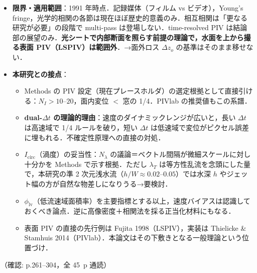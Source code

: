 \documentclass[11pt]{jsarticle}
\begin{document}
\begin{itemize}
\begin{itemize}
    \item 散乱光は小粒子域（1--10~$\mu$m）で像の明るさが $d_p^3$ に比例（散乱エネルギーは $d_p^3$ で増えるが，像の大きさは回折で決まり粒径に依存しないため）．スリップ速度は $d_p^2$ に比例するので，最も明るく写る粒子が最も流れに追従していない＝均一粒径が望ましい．ただし幾何散乱域（100~$\mu$m 以上）では像の明るさは粒径に依存しなくなる（式 16）．
    \item \textbf{装置を $m$ 倍にすると像の明るさは $m^{-5}$ で低下}（式 15．$d_o$, $d_i$, $\Delta y_o$ が各 $m$ 倍のため）．大きな装置ほど PIV は原理的に不利．→本研究の basin $3 \times 2$~m という大視野で mm 級の浮遊トレーサを使う必然性の根拠になる（実験室 PIV の視野は $25 \times 35$~mm 程度）．
    \item 緑 $>$ 赤（明るさ $\lambda^{-3}$，フィルム感度，光シート最小厚 $\sim \lambda$ の 3 効果）．ただし本研究はレーザー・光シートを使わないため，この論点は適用外．
  \end{itemize}
  \item \textbf{限界・適用範囲}：1991 年時点．記録媒体（フィルム vs ビデオ），Young's fringe，光学的相関の各節は現在ほぼ歴史的意義のみ．相互相関は「更なる研究が必要」の段階で multi-pass は登場しない．time-resolved PIV は結論部の展望のみ．\textbf{光シートで内部断面を照らす前提の理論で，水面を上から撮る表面 PIV（LSPIV）は範囲外}．→面外ロス $\Delta z_o$ の基準はそのまま移せない．
  \item \textbf{本研究との接点}：
  \begin{itemize}
    \item Methods の PIV 設定（現在プレースホルダ）の選定根拠として直接引ける：$N_I > 10$--$20$，面内変位 $<$ 窓の 1/4．PIVlab の推奨値もこの系譜．
    \item \textbf{dual-$\Delta t$ の理論的理由}：速度のダイナミックレンジが広いと，長い $\Delta t$ は高速域で 1/4 ルールを破り，短い $\Delta t$ は低速域で変位がピクセル誤差に埋もれる．不確定性原理への直接の対処．
    \item $I_\mathrm{circ}$（渦度）の妥当性：$N_\lambda$ の議論＝ベクトル間隔が微細スケールに対し十分かを Methods で示す根拠．ただし $\lambda_T$ は等方性乱流を念頭にした量で，本研究の準 2 次元浅水流（$h/W \approx 0.02$--$0.05$）では水深 $h$ やジェット幅の方が自然な物差しになりうる→要検討．
    \item $\phi_\mathrm{lv}$（低流速域面積率）を主要指標とする以上，速度バイアスは認識しておくべき論点．逆に高像密度＋相関法を採る正当化材料にもなる．
    \item 表面 PIV の直接の先行例は Fujita 1998（LSPIV），実装は Thielicke \& Stamhuis 2014（PIVlab）．本論文はその下敷きとなる一般理論という位置づけ．
  \end{itemize}
\end{itemize}
\noindent（確認: p.261--304，全 45~p 通読）
\end{document}
